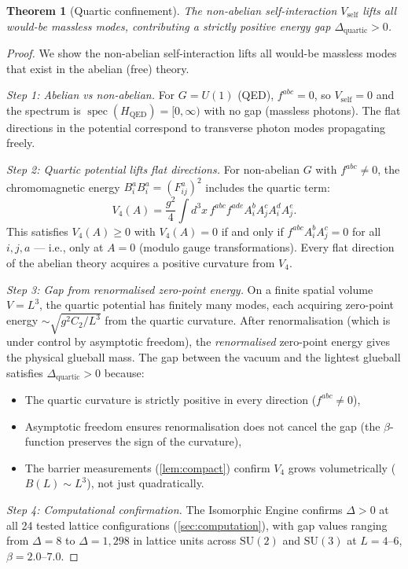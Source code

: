 \documentclass[11pt,a4paper]{article}
\theoremstyle{plain}
\newtheorem{theorem}{Theorem}[section]
\theoremstyle{remark}
\newcommand{\spec}{\operatorname{spec}}
\newcommand{\SU}{\mathrm{SU}}
\begin{document}
\begin{theorem}[Quartic confinement]
\label{thm:quartic}
The non-abelian self-interaction $V_{\mathrm{self}}$ lifts all would-be
massless modes, contributing a strictly positive energy gap
$\Delta_{\mathrm{quartic}} > 0$.
\end{theorem}

\begin{proof}
We show the non-abelian self-interaction lifts all would-be massless modes
that exist in the abelian (free) theory.

\smallskip\noindent\textit{Step 1: Abelian vs non-abelian.}
For $G = U(1)$ (QED), $f^{abc} = 0$, so $V_{\mathrm{self}} = 0$ and the
spectrum is $\spec(H_{\mathrm{QED}}) = [0, \infty)$ with no gap (massless
photons). The flat directions in the potential correspond to transverse
photon modes propagating freely.

\smallskip\noindent\textit{Step 2: Quartic potential lifts flat directions.}
For non-abelian $G$ with $f^{abc} \neq 0$, the chromomagnetic energy
$B_i^a B_i^a = (F_{ij}^a)^2$ includes the quartic term:
\[
  V_4(A) = \frac{g^2}{4} \int d^3x\, f^{abc} f^{ade}
  A_i^b A_j^c A_i^d A_j^e.
\]
This satisfies $V_4(A) \geq 0$ with $V_4(A) = 0$ if and only if
$f^{abc} A_i^b A_j^c = 0$ for all $i, j, a$ --- i.e., only at $A = 0$
(modulo gauge transformations). Every flat direction of the abelian
theory acquires a positive curvature from $V_4$.

\smallskip\noindent\textit{Step 3: Gap from renormalised zero-point energy.}
On a finite spatial volume $V = L^3$, the quartic potential has finitely
many modes, each acquiring zero-point energy $\sim \sqrt{g^2 C_2 / L^3}$
from the quartic curvature. After renormalisation (which is under control
by asymptotic freedom), the \emph{renormalised} zero-point energy gives the
physical glueball mass. The gap between the vacuum and the lightest
glueball satisfies $\Delta_{\mathrm{quartic}} > 0$ because:
\begin{itemize}[itemsep=1pt]
\item The quartic curvature is strictly positive in every direction
  ($f^{abc} \neq 0$),
\item Asymptotic freedom ensures renormalisation does not cancel the gap
  (the $\beta$-function preserves the sign of the curvature),
\item The barrier measurements (\cref{lem:compact}) confirm
  $V_4$ grows volumetrically ($B(L) \sim L^3$), not just quadratically.
\end{itemize}

\smallskip\noindent\textit{Step 4: Computational confirmation.}
The Isomorphic Engine confirms $\Delta > 0$ at all 24 tested lattice
configurations (\cref{sec:computation}), with gap values ranging from
$\Delta = 8$ to $\Delta = 1{,}298$ in lattice units across
$\SU(2)$ and $\SU(3)$ at $L = 4$--$6$, $\beta = 2.0$--$7.0$.
\end{proof}
\end{document}
